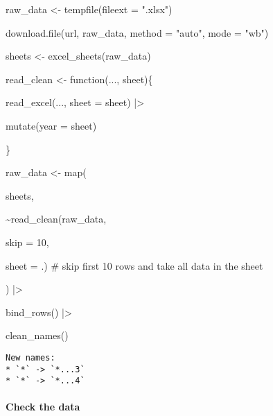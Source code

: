 \documentclass[
  letterpaper,
  DIV=11,
  numbers=noendperiod]{scrartcl}
\let\oldparagraph\paragraph
\renewcommand{\paragraph}[1]{\oldparagraph{#1}\mbox{}}
\newenvironment{Shaded}{\begin{snugshade}}{\end{snugshade}}
\newcommand{\AttributeTok}[1]{\textcolor[rgb]{0.40,0.45,0.13}{#1}}
\newcommand{\CommentTok}[1]{\textcolor[rgb]{0.37,0.37,0.37}{#1}}
\newcommand{\ControlFlowTok}[1]{\textcolor[rgb]{0.00,0.23,0.31}{#1}}
\newcommand{\DecValTok}[1]{\textcolor[rgb]{0.68,0.00,0.00}{#1}}
\newcommand{\FunctionTok}[1]{\textcolor[rgb]{0.28,0.35,0.67}{#1}}
\newcommand{\NormalTok}[1]{\textcolor[rgb]{0.00,0.23,0.31}{#1}}
\newcommand{\OtherTok}[1]{\textcolor[rgb]{0.00,0.23,0.31}{#1}}
\newcommand{\SpecialCharTok}[1]{\textcolor[rgb]{0.37,0.37,0.37}{#1}}
\newcommand{\StringTok}[1]{\textcolor[rgb]{0.13,0.47,0.30}{#1}}
\begin{document}
\begin{Shaded}
\begin{Highlighting}[]
\NormalTok{raw\_data }\OtherTok{\textless{}{-}} \FunctionTok{tempfile}\NormalTok{(}\AttributeTok{fileext =} \StringTok{".xlsx"}\NormalTok{)}



\FunctionTok{download.file}\NormalTok{(url, raw\_data, }\AttributeTok{method =} \StringTok{"auto"}\NormalTok{, }\AttributeTok{mode =} \StringTok{"wb"}\NormalTok{)}



\NormalTok{sheets }\OtherTok{\textless{}{-}} \FunctionTok{excel\_sheets}\NormalTok{(raw\_data)}



\NormalTok{read\_clean }\OtherTok{\textless{}{-}} \ControlFlowTok{function}\NormalTok{(..., sheet)\{}
  
  \FunctionTok{read\_excel}\NormalTok{(..., }\AttributeTok{sheet =}\NormalTok{ sheet) }\SpecialCharTok{|\textgreater{}}
    
    \FunctionTok{mutate}\NormalTok{(}\AttributeTok{year =}\NormalTok{ sheet)}
  
\NormalTok{\}}



\NormalTok{raw\_data }\OtherTok{\textless{}{-}} \FunctionTok{map}\NormalTok{(}
  
\NormalTok{  sheets,}
  
  \SpecialCharTok{\textasciitilde{}}\FunctionTok{read\_clean}\NormalTok{(raw\_data,}
              
              \AttributeTok{skip =} \DecValTok{10}\NormalTok{,}
              
              \AttributeTok{sheet =}\NormalTok{ .) }\CommentTok{\# skip first 10 rows and take all data in the sheet}
  
\NormalTok{) }\SpecialCharTok{|\textgreater{}}
  
  \FunctionTok{bind\_rows}\NormalTok{() }\SpecialCharTok{|\textgreater{}}
  
  \FunctionTok{clean\_names}\NormalTok{()}
\end{Highlighting}
\end{Shaded}

\begin{verbatim}
New names:
* `*` -> `*...3`
* `*` -> `*...4`
\end{verbatim}

\hypertarget{check-the-data}{%
\paragraph{Check the data}\label{check-the-data}}
\end{document}
